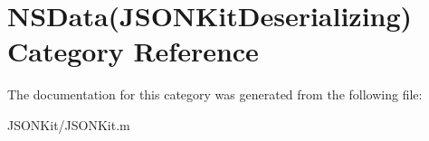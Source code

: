 \hypertarget{category_n_s_data_07_j_s_o_n_kit_deserializing_08}{\section{N\+S\+Data(J\+S\+O\+N\+Kit\+Deserializing) Category Reference}
\label{category_n_s_data_07_j_s_o_n_kit_deserializing_08}
}


The documentation for this category was generated from the following file\+:\begin{DoxyCompactItemize}
\item 
J\+S\+O\+N\+Kit/J\+S\+O\+N\+Kit.\+m\end{DoxyCompactItemize}
